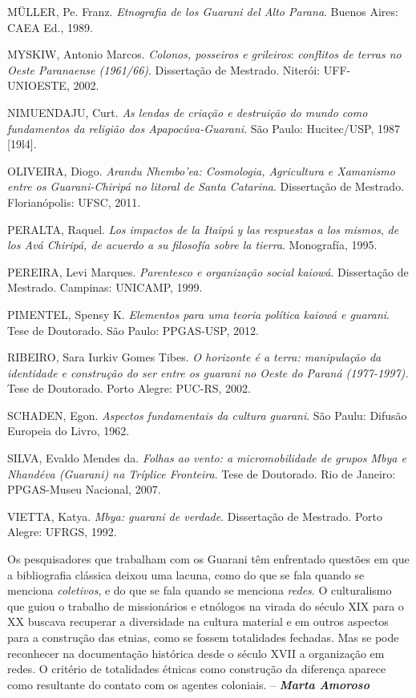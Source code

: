 MÜLLER, Pe. Franz. \emph{Etnografia de los Guarani del Alto Parana}.
Buenos Aires: CAEA Ed., 1989.

MYSKIW, Antonio Marcos. \emph{Colonos, posseiros e grileiros}:
\emph{conflitos de terras no Oeste Paranaense (1961/66)}. Dissertação de
Mestrado. Niterói: UFF-UNIOESTE, 2002.

NIMUENDAJU, Curt. \emph{As lendas de criação e destruição do mundo como
fundamentos da religião dos Apapocúva-Guarani}. São Paulo: Hucitec/USP,
1987 {[}19l4{]}.

OLIVEIRA, Diogo. \emph{Arandu Nhembo'ea: Cosmologia, Agricultura e
Xamanismo entre os Guarani-Chiripá no litoral de Santa Catarina}.
Dissertação de Mestrado. Florianópolis: UFSC, 2011.

PERALTA, Raquel. \emph{Los impactos de la Itaipú y las respuestas a los
mismos}, \emph{de los Avá Chiripá, de acuerdo a su filosofía sobre la
tierra}. Monografía, 1995.

PEREIRA, Levi Marques. \emph{Parentesco e organização social kaiowá}.
Dissertação de Mestrado. Campinas: UNICAMP, 1999.

PIMENTEL, Spensy K. \emph{Elementos para uma teoria política kaiowá e
guarani}. Tese de Doutorado. São Paulo: PPGAS-USP, 2012.

RIBEIRO, Sara Iurkiv Gomes Tibes. \emph{O horizonte é a terra:
manipulação da identidade e construção do ser entre os guarani no Oeste
do Paraná (1977-1997).} Tese de Doutorado. Porto Alegre: PUC-RS, 2002.

SCHADEN, Egon. \emph{Aspectos fundamentais da cultura guarani}. São
Paulu: Difusão Europeia do Livro, 1962.

SILVA, Evaldo Mendes da. \emph{Folhas ao vento: a micromobilidade de
grupos Mbya e Nhandéva (Guarani) na Tríplice Fronteira}. Tese de
Doutorado. Rio de Janeiro: PPGAS-Museu Nacional, 2007.

VIETTA, Katya. \emph{Mbya: guarani de verdade}. Dissertação de Mestrado.
Porto Alegre: UFRGS, 1992.

Os pesquisadores que trabalham com os Guarani têm enfrentado questões em
que a bibliografia clássica deixou uma lacuna, como do que se fala
quando se menciona \emph{coletivos}, e do que se fala quando se menciona
\emph{redes}. O culturalismo que guiou o trabalho de missionários e
etnólogos na virada do século XIX para o XX buscava recuperar a
diversidade na cultura material e em outros aspectos para a construção
das etnias, como se fossem totalidades fechadas. Mas se pode reconhecer
na documentação histórica desde o século XVII a organização em redes. O
critério de totalidades étnicas como construção da diferença aparece
como resultante do contato com os agentes coloniais. --
\emph{\textbf{Marta Amoroso}}

